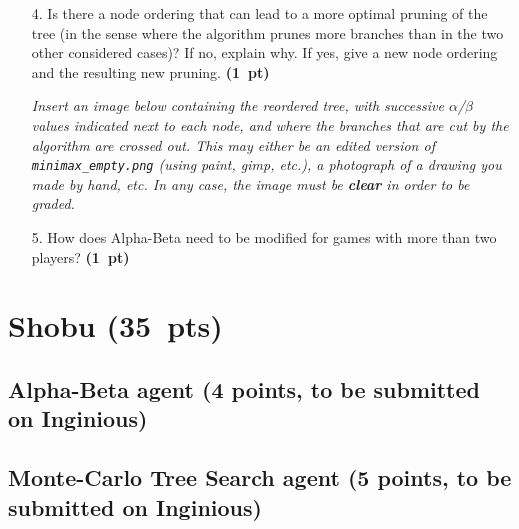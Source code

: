 \documentclass[11pt,a4paper]{report}
\begin{document}
\clearpage
\begin{enumerate}
\item[4.] Is there a node ordering that can lead to a more optimal pruning of the tree
(in the sense where the algorithm prunes more branches than in the two other
considered cases)? If no, explain why. If yes, give a new node ordering and the
resulting new pruning.  \textbf{(1~pt)}
      
      \textit{Insert an image below containing the reordered tree, with successive $\alpha$/$\beta$ values indicated next to each node, and where the branches that are cut by the algorithm are crossed out. This may either be an edited version of \texttt{minimax\_empty.png} (using paint, gimp, etc.), a photograph of a drawing you made by hand, etc. In any case, the image must be \textbf{clear} in order to be graded.}
\end{enumerate}

\begin{answers}[8cm]
\end{answers}




\begin{enumerate}
\item[5.] How does Alpha-Beta need to be modified for games with more than two players? \textbf{(1~pt)}
\end{enumerate}

\begin{answers}[9cm]
\end{answers}





\clearpage
\section{Shobu (35~pts)}
\medskip

\subsection{Alpha-Beta agent (4 points, to be submitted on Inginious)}
\medskip


\subsection{Monte-Carlo Tree Search agent (5 points, to be submitted on Inginious)}
\medskip
\end{document}
